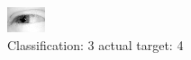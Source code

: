 \begin{figure}[h!]
\begin{center}
\includegraphics[width=0.60\columnwidth]{figures/ID2474_class_3_target_4.png}
\end{center}
\caption{ Classification: 3 actual target: 4}
\label{fig:ID2474_class_3_target_4}
\end{figure}
